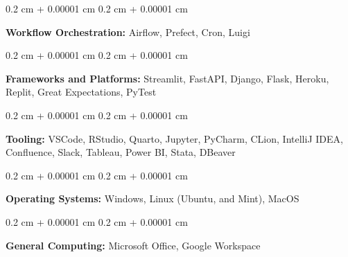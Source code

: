 \documentclass[10pt, letterpaper]{article}
\newenvironment{onecolentry}{
    \begin{adjustwidth}{
        0.2 cm + 0.00001 cm
    }{
        0.2 cm + 0.00001 cm
    }
}{
    \end{adjustwidth}
} %
\begin{document}
        \begin{onecolentry}
            \textbf{Workflow Orchestration:} Airflow, Prefect, Cron, Luigi
        \end{onecolentry}

        \vspace{0.2 cm}

        \begin{onecolentry}
            \textbf{Frameworks and Platforms:} Streamlit, FastAPI, Django, Flask, Heroku, Replit, Great Expectations, PyTest
        \end{onecolentry}

        \vspace{0.2 cm}

        \begin{onecolentry}
            \textbf{Tooling:} VSCode, RStudio, Quarto, Jupyter, PyCharm, CLion, IntelliJ IDEA, Confluence, Slack, Tableau, Power BI, Stata, DBeaver
        \end{onecolentry}

        \vspace{0.2 cm}

        \begin{onecolentry}
            \textbf{Operating Systems:} Windows, Linux (Ubuntu, and Mint), MacOS
        \end{onecolentry}

        \vspace{0.2 cm}

        \begin{onecolentry}
            \textbf{General Computing:} Microsoft Office, Google Workspace
        \end{onecolentry}


    
\end{document}
